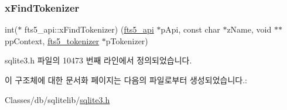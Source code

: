 \subsubsection{\texorpdfstring{x\+Find\+Tokenizer}{xFindTokenizer}}
{\footnotesize\ttfamily int($\ast$ fts5\+\_\+api\+::x\+Find\+Tokenizer) (\hyperlink{structfts5__api}{fts5\+\_\+api} $\ast$p\+Api, const char $\ast$z\+Name, void $\ast$$\ast$pp\+Context, \hyperlink{structfts5__tokenizer}{fts5\+\_\+tokenizer} $\ast$p\+Tokenizer)}



sqlite3.\+h 파일의 10473 번째 라인에서 정의되었습니다.



이 구조체에 대한 문서화 페이지는 다음의 파일로부터 생성되었습니다.\+:\begin{DoxyCompactItemize}
\item 
Classes/db/sqlitelib/\hyperlink{sqlite3_8h}{sqlite3.\+h}\end{DoxyCompactItemize}
